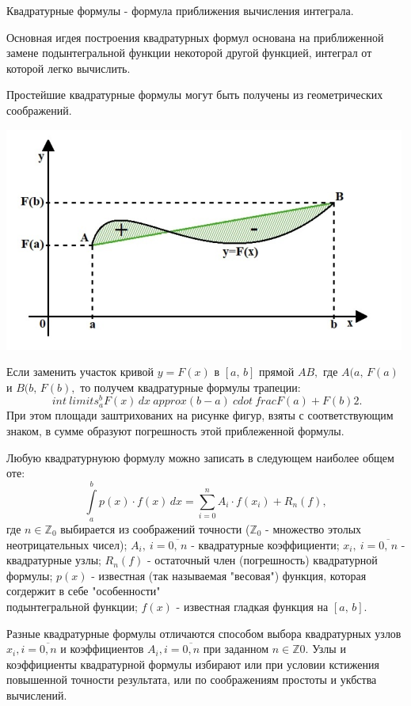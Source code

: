 \documentclass[14pt,a4paper,titlepage]{extarticle}
\begin{document}
Квадратурные формулы - формула приближения вычисления интеграла.

Основная игдея построения квадратурных формул основана на приближенной замене подынтегральной функции некоторой другой функцией, интеграл от которой легко вычислить.

Простейшие квадратурные формулы могут быть получены из геометрических соображений.

{\centering \includegraphics{2}\par}
Если заменить участок кривой $ y = F (x) $ в $ [a, \, b] $ прямой $ AB, $ где $ A (a, \, F (a) $ и $ B (b, \, F ( b), $ то получем квадратурные формулы трапеции:
$$ \ int \ limits_a ^ b F (x) \, dx \ approx (b-a) \ cdot \ frac {F (a) + F (b)} {2}. $$
При этом площади заштрихованих на рисунке фигур, взяты с соответствующим знаком, в сумме образуют погрешность этой приблеженной формулы.

Любую квадратурнуюю формулу можно записать в следующем наиболее общем оте:
\begin{equation}
\int\limits_a^b p(x)\cdot f(x)\, dx = \sum_{i=0}^n A_i\cdot f(x_i)+R_n(f),
\end{equation}
где $n\in \mathbb{Z}_0$ выбирается из соображений точности ($\mathbb{Z}_0$ - множество этолых неотрицательных чисел); $A_i,\ i=\overline{0,\, n}$ - квадратурные коэффициенти;  $x_i,\ i=\overline{0,\, n}$ - квадратурные узлы; $R_n(f)$ - остаточный член (погрешность) квадратурной формулы; $p(x)$ - известная (так называемая "весовая") функция, которая согдержит в себе "особенности"
\\подынтегральной функции; $f(x)$ - известная гладкая функция на $[a,\, b].$

Разные квадратурные формулы отличаются способом выбора квадратурных узлов $x _ i, i=\overline{0, n}$ и коэффициентов $A _ i, i=\overline{0,n}$ при заданном $n\in \mathbb{Z} 0.$ Узлы и коэффициенты квадратурной формулы избирают или при условии кстижения повышенной точности результата, или по соображениям простоты и укбства вычислений.
\end{document}
